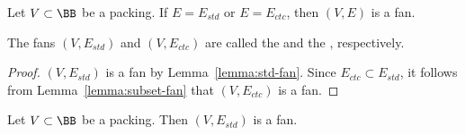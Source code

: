 
\begin{lemma}[]\label{lemma:ctc-fan}
Let $V\subset \BB$ be a packing.  If $E=E_{std}$ or $E=E_{ctc}$, then
$(V,E)$ is a fan.
\end{lemma}

\begin{definition}
The fans $(V,E_{std})$ and $(V,E_{ctc})$ are called the  and
the , respectively.  
\end{definition}
%
%
%
%
%
%
%

\begin{proof} 
  $(V,E_{std})$ is a fan by Lemma~\ref{lemma:std-fan}.  Since
  $E_{ctc}\subset E_{std}$, it follows from
  Lemma~\ref{lemma:subset-fan} that $(V,E_{ctc})$ is a fan.
\end{proof}


\begin{lemma}\label{lemma:std-fan} 
Let $V\subset \BB$ be a packing.  
Then $(V,E_{std})$ is a fan.
\end{lemma}
%

